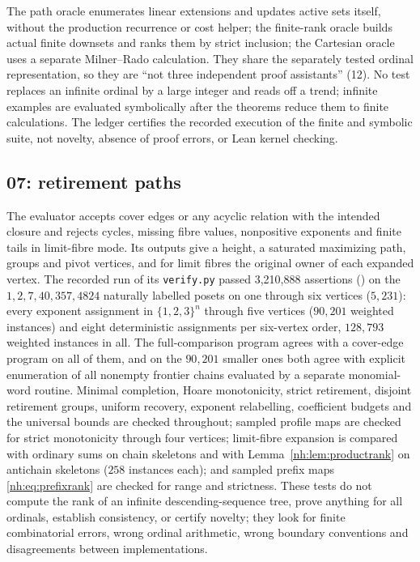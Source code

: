 \documentclass[11pt,a4paper]{article}
\theoremstyle{definition}
\theoremstyle{remark}
\begin{document}
The path oracle enumerates linear extensions and updates active sets itself,
without the production recurrence or cost helper; the finite-rank oracle builds
actual finite downsets and ranks them by strict inclusion; the Cartesian oracle
uses a separate Milner--Rado calculation. They share the separately tested
ordinal representation, so they are ``not three independent proof assistants''
(12). No test replaces an infinite ordinal by a large integer and reads off a
trend; infinite examples are evaluated symbolically after the theorems reduce
them to finite calculations. The ledger certifies the recorded execution of the
finite and symbolic suite, not novelty, absence of proof errors, or Lean kernel
checking.

\subsection{07: retirement paths}

The evaluator  accepts cover edges or any
acyclic relation with the intended closure and rejects cycles, missing fibre
values, nonpositive exponents and finite tails in limit-fibre mode. Its outputs
give a height, a saturated maximizing path, groups and pivot vertices, and for
limit fibres the original owner of each expanded vertex. The recorded run of its
\texttt{verify.py} passed 3{,}210{,}888 assertions
() on the $1,2,7,40,357,4824$
naturally labelled posets on one through six vertices ($5{,}231$): every
exponent assignment in $\{1,2,3\}^n$ through five vertices ($90{,}201$ weighted
instances) and eight deterministic assignments per six-vertex order, $128{,}793$
weighted instances in all. The full-comparison program agrees with a cover-edge
program on all of them, and on the $90{,}201$ smaller ones both agree with
explicit enumeration of all nonempty frontier chains evaluated by a separate
monomial-word routine. Minimal completion, Hoare monotonicity, strict
retirement, disjoint retirement groups, uniform recovery, exponent relabelling,
coefficient budgets and the universal bounds are checked throughout; sampled
profile maps are checked for strict monotonicity through four vertices;
limit-fibre expansion is compared with ordinary sums on chain skeletons and with
Lemma~\ref{nh:lem:productrank} on antichain skeletons ($258$ instances each); and
sampled prefix maps \eqref{nh:eq:prefixrank} are checked for range and
strictness. These tests do not compute the rank of an infinite
descending-sequence tree, prove anything for all ordinals, establish
consistency, or certify novelty; they look for finite combinatorial errors,
wrong ordinal arithmetic, wrong boundary conventions and disagreements between
implementations.
\end{document}
